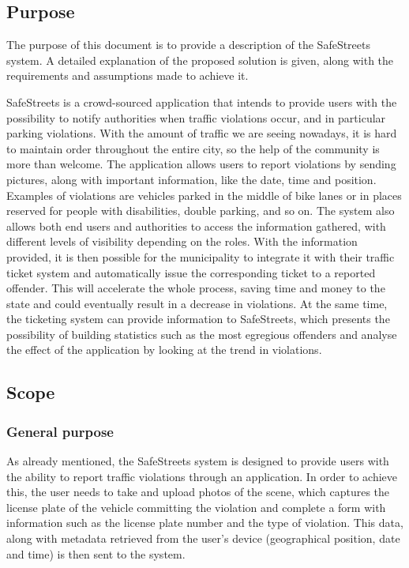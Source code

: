 \subsection{Purpose}

The purpose of this document is to provide a description of the SafeStreets system. A detailed explanation of the proposed solution is given, along with the requirements and assumptions made to achieve it.

SafeStreets is a crowd-sourced application that	 intends to provide users with the possibility to notify authorities when traffic violations occur, and in particular	 parking violations. With the amount of traffic we are seeing nowadays, it is hard to maintain order throughout the entire city, so the help of the community is more than welcome.
The application allows users to report violations by sending pictures, along with important information, like the date, time and position.
Examples of violations are vehicles parked in the middle of bike lanes or in places reserved for people with disabilities, double parking, and so on.
The system also allows both end users and authorities to access the information gathered, with different levels of visibility depending on the roles.
With the information provided, it is then possible for the municipality to integrate it with their traffic ticket system and automatically issue the corresponding ticket to a reported offender. This will accelerate the whole process, saving time and money to the state and could eventually result in a decrease in violations.
At the same time, the ticketing system can provide information to SafeStreets, which presents the possibility of building statistics such as the most egregious offenders and analyse the effect of the application by looking at the trend in violations.

\subsection{Scope}

\subsubsection{General purpose}

As already mentioned, the SafeStreets system is designed to provide users with the ability to report traffic violations through an application. In order to achieve this, the user needs to take and upload photos of the scene, which captures the license plate of the vehicle committing the violation and complete a form with information such as the license plate number and the type of violation. This data, along with metadata retrieved from the user’s device (geographical position, date and time) is then sent to the system.

